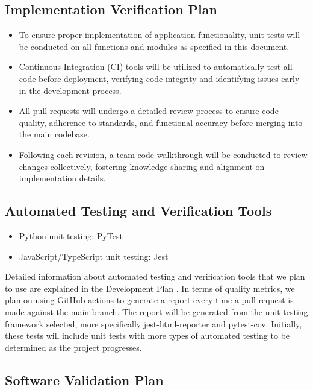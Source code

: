 \documentclass[12pt, titlepage]{article}
\begin{document}
\subsection{Implementation Verification Plan}

\begin{itemize}
  \item To ensure proper implementation of application functionality,
    unit tests will be conducted on all functions and modules as
    specified in this document.
  \item Continuous Integration (CI) tools will be utilized to
    automatically test all code before deployment, verifying code
    integrity and identifying issues early in the development process.
  \item All pull requests will undergo a detailed review process to
    ensure code quality, adherence to standards, and functional
    accuracy before merging into the main codebase.
  \item Following each revision, a team code walkthrough will be
    conducted to review changes collectively, fostering knowledge
    sharing and alignment on implementation details.
\end{itemize}

\subsection{Automated Testing and Verification Tools}
\begin{itemize}
  \item Python unit testing: PyTest
  \item JavaScript/TypeScript unit testing: Jest
\end{itemize}
Detailed information about automated testing and verification tools
that we plan to use are explained in the Development Plan
\citep[\textit{Expected Technology, Coding Standard}]{ProblemStatement}.
In terms of quality metrics, we plan on using GitHub actions to
generate a report
every time a pull request is made against the main branch. The report
will be generated from the unit testing framework selected, more
specifically jest-html-reporter and pytest-cov. Initially, these tests
will include unit tests with more types of automated testing to be determined as
the project progresses.

\subsection{Software Validation Plan}
\end{document}
